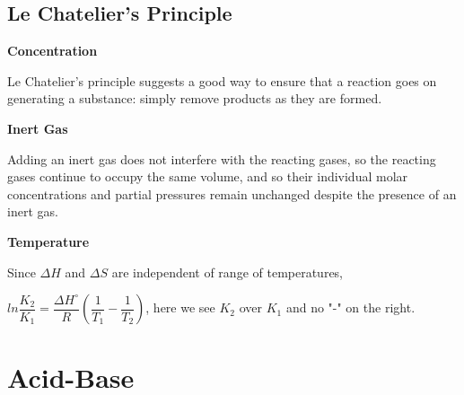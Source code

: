 \documentclass[a4paper,12pt]{article}
\begin{document}
\subsection{Le Chatelier's Principle}
\textbf{Concentration}\par
Le Chatelier's principle suggests a good way to ensure that a reaction goes on generating a substance: simply remove products as they are formed.\par
\textbf{Inert Gas}\par
Adding an inert gas does not interfere with the reacting gases, so the reacting gases continue to occupy the same volume, and so their individual molar concentrations and partial pressures remain unchanged despite the presence of an inert gas.\par
\textbf{Temperature}\par
Since $\Delta H$ and $\Delta S$ are independent of range of temperatures,\par $ln\dfrac{K_{2}}{K_{1}}=\dfrac{\Delta H^{\circ}}{R}(\dfrac{1}{T_{1}}-\dfrac{1}{T_{2}})$, here we see $K_{2}$ over $K_{1}$ and no "-" on the right.








\newpage
\section{Acid-Base}
\end{document}

